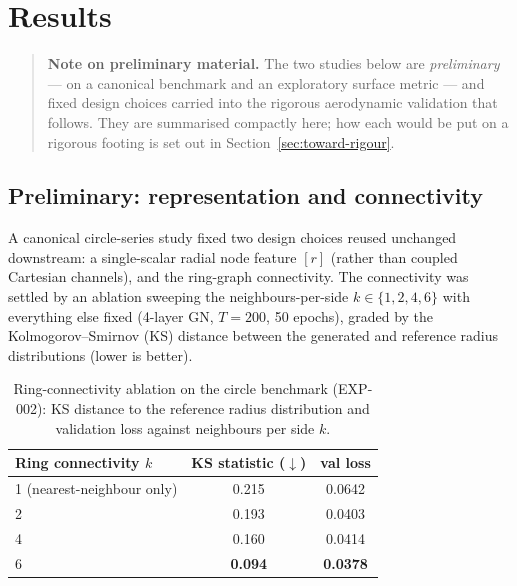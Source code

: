 \section{Results}

\begin{quote}
\textbf{Note on preliminary material.} The two studies below are \emph{preliminary} --- on a canonical
benchmark and an exploratory surface metric --- and fixed design choices carried into the rigorous
aerodynamic validation that follows. They are summarised compactly here; how each would be put on a
rigorous footing is set out in Section~\ref{sec:toward-rigour}.
\end{quote}

\subsection{Preliminary: representation and connectivity}

A canonical circle-series study fixed two design choices reused unchanged downstream: a single-scalar
radial node feature $[r]$ (rather than coupled Cartesian channels), and the ring-graph connectivity.
The connectivity was settled by an ablation sweeping the neighbours-per-side $k \in \{1, 2, 4, 6\}$ with
everything else fixed (4-layer GN, $T = 200$, 50 epochs), graded by the Kolmogorov--Smirnov (KS)
distance between the generated and reference radius distributions (lower is better).

\begin{table}[t]
  \centering
  \begin{tabular}{lcc}
    \toprule
    Ring connectivity $k$ & KS statistic ($\downarrow$) & val loss \\
    \midrule
    1 (nearest-neighbour only) & 0.215          & 0.0642          \\
    2                          & 0.193          & 0.0403          \\
    4                          & 0.160          & 0.0414          \\
    6                          & \textbf{0.094} & \textbf{0.0378} \\
    \bottomrule
  \end{tabular}
  \caption{Ring-connectivity ablation on the circle benchmark (EXP-002): KS distance to the reference
  radius distribution and validation loss against neighbours per side $k$.}
  \label{tab:connectivity}
\end{table}

